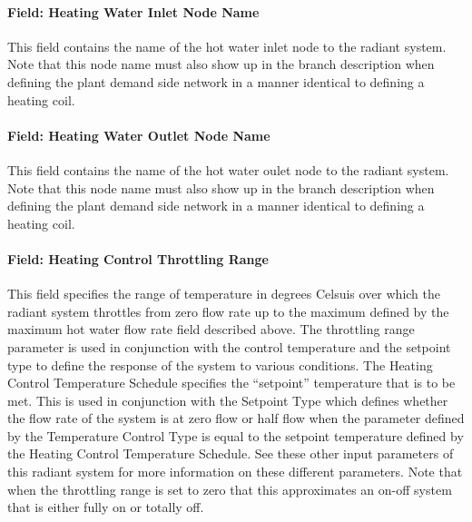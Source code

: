 \paragraph{Field: Heating Water Inlet Node Name}\label{field-heating-water-inlet-node-name}

This field contains the name of the hot water inlet node to the radiant system. Note that this node name must also show up in the branch description when defining the plant demand side network in a manner identical to defining a heating coil.

\paragraph{Field: Heating Water Outlet Node Name}\label{field-heating-water-outlet-node-name}

This field contains the name of the hot water oulet node to the radiant system. Note that this node name must also show up in the branch description when defining the plant demand side network in a manner identical to defining a heating coil.

\paragraph{Field: Heating Control Throttling Range}\label{field-heating-control-throttling-range}

This field specifies the range of temperature in degrees Celsuis over which the radiant system throttles from zero flow rate up to the maximum defined by the maximum hot water flow rate field described above. The throttling range parameter is used in conjunction with the control temperature and the setpoint type to define the response of the system to various conditions. The Heating Control Temperature Schedule specifies the ``setpoint'' temperature that is to be met.  This is used in conjunction with the Setpoint Type which defines whether the flow rate of the system is at zero flow or half flow when the parameter defined by the Temperature Control Type is equal to the setpoint temperature defined by the Heating Control Temperature Schedule.  See these other input parameters of this radiant system for more information on these different parameters.  Note that when the throttling range is set to zero that this approximates an on-off system that is either fully on or totally off.

